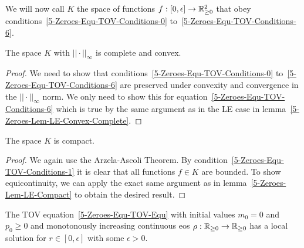We will now call $K$ the space of functions $f:[0,\epsilon]\rightarrow\mathbb{R}_{\geq0}^2$ that obey conditions~\eqref{5-Zeroes-Equ-TOV-Conditions-0} to~\eqref{5-Zeroes-Equ-TOV-Conditions-6}.
\begin{lemma}
	\label{5-Zeroes-Lem-K-Complete-Convex}
	The space $K$ with $||\cdot||_\infty$ is complete and convex.
\end{lemma}
\begin{proof}
	We need to show that conditions~\eqref{5-Zeroes-Equ-TOV-Conditions-0} to~\eqref{5-Zeroes-Equ-TOV-Conditions-6} are preserved under convexity and convergence in the $||\cdot||_\infty$ norm.
	We only need to show this for equation~\eqref{5-Zeroes-Equ-TOV-Conditions-6} which is true by the same argument as in the \ac{LE} case in lemma~\ref{5-Zeroes-Lem-LE-Convex-Complete}.
\end{proof}
\begin{lemma}
	The space $K$ is compact.
\end{lemma}
\begin{proof}
	We again use the Arzela-Ascoli Theorem.
	By condition~\eqref{5-Zeroes-Equ-TOV-Conditions-1} it is clear that all functions $f\in K$ are bounded.
	To show equicontinuity, we can apply the exact same argument as in lemma~\ref{5-Zeroes-Lem-LE-Compact} to obtain the desired result.
\end{proof}
\begin{lemma}
	The \ac{TOV} equation~\ref{5-Zeroes-Equ-TOV-Equ} with initial values $m_0=0$ and $p_0\geq0$ and monotonously increasing continuous \ac{eos} $\rho:\mathbb{R}_{\geq0}\rightarrow\mathbb{R}_{\geq0}$ has a local solution for $r\in[0,\epsilon]$ with some $\epsilon>0$.
\end{lemma}
